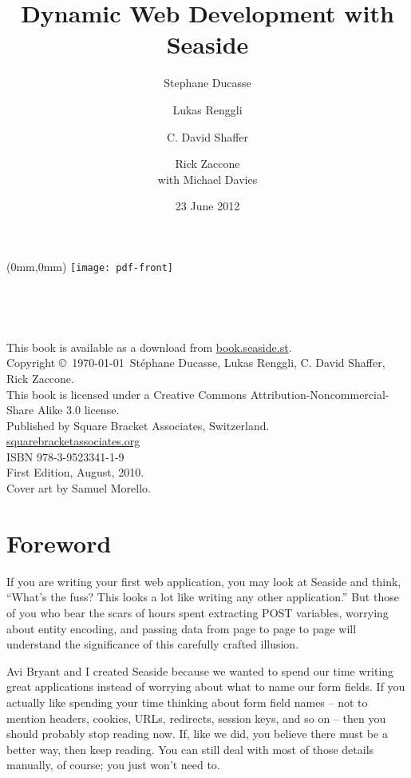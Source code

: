 \documentclass[a4paper,10pt,twoside]{book}
\title{Dynamic Web Development with Seaside}
\author{Stephane Ducasse
\and Lukas Renggli
\and C. David Shaffer
\and Rick Zaccone
\\[4ex]
with Michael Davies
}
\date{23 June 2012}
\begin{document}
\frontmatter

\thispagestyle{empty}
\begin{textblock*}{\paperwidth}(0mm,0mm)
   \texttt{[image: pdf-front]}
\end{textblock*}
~\cleardoublepage


\maketitle
	
~
\vfill
\begin{footnotesize}
This book is available as a download from \href{http://book.seaside.st}{book.seaside.st}. \\[4ex]

Copyright \copyright~\today~St\'ephane Ducasse, Lukas Renggli, C. David Shaffer, Rick Zaccone. \\
This book is licensed under a Creative Commons Attribution-Noncommercial-Share Alike 3.0 license. \\[4ex]

Published by Square Bracket Associates, Switzerland. \\
\href{http://squarebracketassociates.org/}{squarebracketassociates.org} \\
ISBN 978-3-9523341-1-9 \\
First Edition, August, 2010. \\
Cover art by Samuel Morello.
\end{footnotesize}

\tableofcontents
\sloppy

\mainmatter



\chapter*{Foreword}
\label{book:foreword}

 If you are writing your first web application, you may look at Seaside and think, ``What's the fuss? This looks a lot like writing any other application.'' But those of you who bear the scars of hours spent extracting POST variables, worrying about entity encoding, and passing data from page to page to page will understand the significance of this carefully crafted illusion.

 Avi Bryant and I created Seaside because we wanted to spend our time writing great applications instead of worrying about what to name our form fields. If you actually like spending your time thinking about form field names -- not to mention headers, cookies, URLs, redirects, session keys, and so on -- then you should probably stop reading now. If, like we did, you believe there must be a better way, then keep reading. You can still deal with most of those details manually, of course; you just won't need to.
\end{document}
